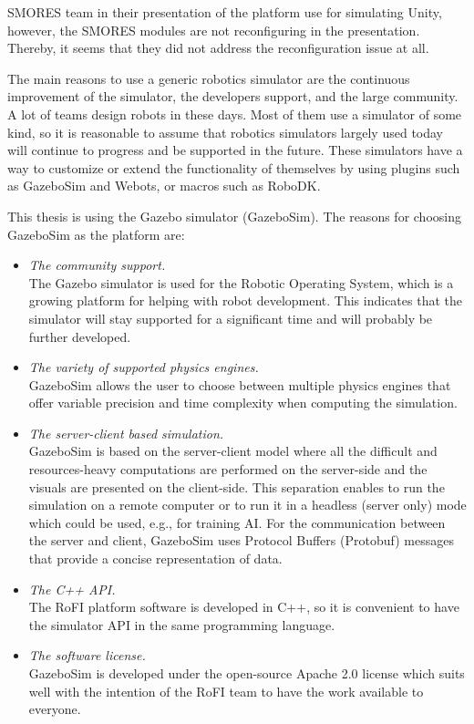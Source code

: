 \documentclass[
  printed, %
  color,   %
  notable, %
  oneside, %
  nolof,   %
  nolot,   %
  nocover,
]{fithesis3}
\begin{document}
SMORES\cite{smores} team in their presentation of the platform\cite{smores-video} use for simulating Unity, however, the SMORES modules are not reconfiguring in the presentation.
Thereby, it seems that they did not address the reconfiguration issue at all.

The main reasons to use a generic robotics simulator are the continuous improvement of the simulator, the developers support, and the large community.
A lot of teams design robots in these days.
Most of them use a simulator of some kind, so it is reasonable to assume that robotics simulators largely used today will continue to progress and be supported in the future.
These simulators have a way to customize or extend the functionality of themselves by using plugins such as GazeboSim\cite{gazebo} and Webots\cite{webots}, or macros such as RoboDK\cite{robodk}.

This thesis is using the Gazebo simulator (GazeboSim).
The reasons for choosing GazeboSim as the platform are:
\begin{itemize}
    \item \emph{The community support.}\\
    The Gazebo simulator is used for the Robotic Operating System\cite{ros}, which is a growing platform for helping with robot development.
    This indicates that the simulator will stay supported for a significant time and will probably be further developed.
    \item \emph{The variety of supported physics engines.}\\
    GazeboSim allows the user to choose between multiple physics engines that offer variable precision and time complexity when computing the simulation.
    \item \emph{The server-client based simulation.}\\
    GazeboSim is based on the server-client model where all the difficult and resources-heavy computations are performed on the server-side and the visuals are presented on the client-side.
    This separation enables to run the simulation on a remote computer or to run it in a headless (server only) mode which could be used, e.g., for training AI.
    For the communication between the server and client, GazeboSim uses Protocol Buffers (Protobuf) messages\cite{protobuf} that provide a concise representation of data.
    \item \emph{The C++ API.}\\
    The RoFI platform software is developed in C++, so it is convenient to have the simulator API in the same programming language.
    \item \emph{The software license.}\\
    GazeboSim is developed under the open-source Apache 2.0 license which suits well with the intention of the RoFI team to have the work available to everyone.
\end{itemize}
\end{document}
